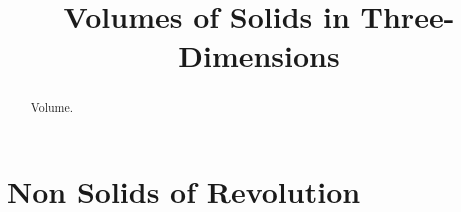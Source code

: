 \documentclass{ximera}
\title{Volumes of Solids in Three-Dimensions}
\begin{document}
\begin{abstract}
Volume.
\end{abstract}
\maketitle

\section{Non Solids of Revolution}
\end{document}
